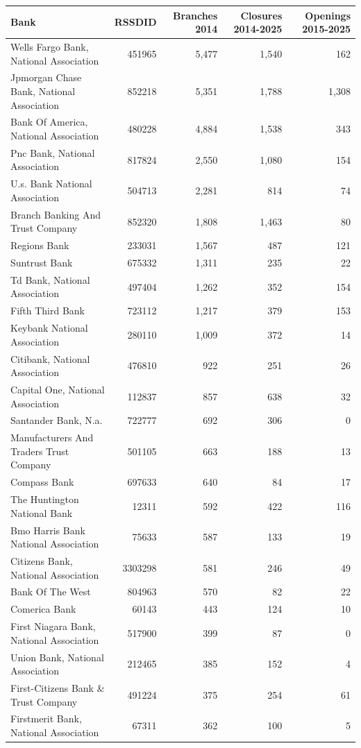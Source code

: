 
\begin{tabular}{lrrrr}
\toprule
Bank & RSSDID & Branches 2014 & Closures 2014-2025 & Openings 2015-2025\\
\midrule
Wells Fargo Bank, National Association & 451965 & 5,477 & 1,540 & 162\\
Jpmorgan Chase Bank, National Association & 852218 & 5,351 & 1,788 & 1,308\\
Bank Of America, National Association & 480228 & 4,884 & 1,538 & 343\\
Pnc Bank, National Association & 817824 & 2,550 & 1,080 & 154\\
U.s. Bank National Association & 504713 & 2,281 & 814 & 74\\
Branch Banking And Trust Company & 852320 & 1,808 & 1,463 & 80\\
Regions Bank & 233031 & 1,567 & 487 & 121\\
Suntrust Bank & 675332 & 1,311 & 235 & 22\\
Td Bank, National Association & 497404 & 1,262 & 352 & 154\\
Fifth Third Bank & 723112 & 1,217 & 379 & 153\\
Keybank National Association & 280110 & 1,009 & 372 & 14\\
Citibank, National Association & 476810 & 922 & 251 & 26\\
Capital One, National Association & 112837 & 857 & 638 & 32\\
Santander Bank, N.a. & 722777 & 692 & 306 & 0\\
Manufacturers And Traders Trust Company & 501105 & 663 & 188 & 13\\
Compass Bank & 697633 & 640 & 84 & 17\\
The Huntington National Bank & 12311 & 592 & 422 & 116\\
Bmo Harris Bank National Association & 75633 & 587 & 133 & 19\\
Citizens Bank, National Association & 3303298 & 581 & 246 & 49\\
Bank Of The West & 804963 & 570 & 82 & 22\\
Comerica Bank & 60143 & 443 & 124 & 10\\
First Niagara Bank, National Association & 517900 & 399 & 87 & 0\\
Union Bank, National Association & 212465 & 385 & 152 & 4\\
First-Citizens Bank \& Trust Company & 491224 & 375 & 254 & 61\\
Firstmerit Bank, National Association & 67311 & 362 & 100 & 5\\

\end{tabular}

